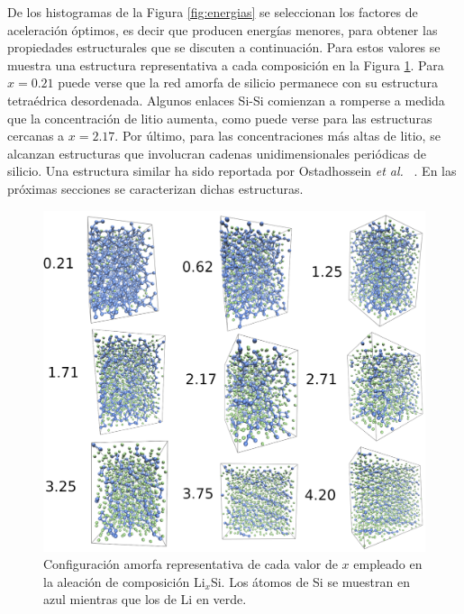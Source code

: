 De los histogramas de la Figura \ref{fig:energias} se seleccionan los factores 
de aceleración óptimos, es decir que producen energías menores, para obtener
las propiedades estructurales que se discuten a continuación. Para estos valores
se muestra una estructura representativa a cada composición en la Figura 
\ref{fig:amorfas}. Para $x = 0.21$ puede verse que la red amorfa de silicio
permanece con su estructura tetraédrica desordenada. Algunos enlaces Si-Si 
comienzan a romperse a medida que la concentración de litio aumenta, como puede
verse para las estructuras cercanas a $x = 2.17$. Por último, para las 
concentraciones más altas de litio, se alcanzan estructuras que involucran 
cadenas unidimensionales periódicas de silicio. Una estructura similar ha sido 
reportada por Ostadhossein \textit{et al.} ~\cite{ostadhossein2015}. En las 
próximas secciones se caracterizan dichas estructuras.
\begin{figure}[h!]
    \centering
    \includegraphics[width=\textwidth]{Silicio/caracterizacion/resultados/introduccion/amorfas.png}
    \caption{Configuración amorfa representativa de cada valor de $x$ empleado en la aleación de composición Li$_x$Si. Los átomos
    de Si se muestran en azul mientras que los de Li en verde.}
    \label{fig:amorfas}
\end{figure}
